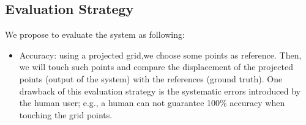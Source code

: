 \documentclass[a4paper,12pt]{article}
\begin{document}
\subsection*{Evaluation Strategy}
We propose to evaluate the system as following:
\begin{itemize}
\item Accuracy: using a projected grid,we choose some points as reference. Then, we will touch such points and compare the displacement of the projected points (output of the system) with the references (ground truth). One drawback of this evaluation strategy is the systematic errors introduced by the human user; e.g., a human can not guarantee 100\% accuracy when touching the grid points.
\end{itemize}

\nocite{*}





\end{document}
